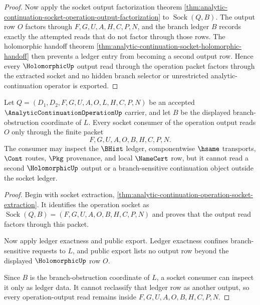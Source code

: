 \begin{proof}
Now apply the socket output factorization theorem \autoref{thm:analytic-continuation-socket-operation-output-factorization} to $\operatorname{Sock}(Q,B)$. The output row $O$ factors through $F,G,U,A,H,C,P,N$, and the branch ledger $B$ records exactly the attempted reads that do not factor through those rows. The holomorphic handoff theorem \autoref{thm:analytic-continuation-socket-holomorphic-handoff} then prevents a ledger entry from becoming a second output row. Hence every $\HolomorphicUp$ output read through the operation packet factors through the extracted socket and no hidden branch selector or unrestricted analytic-continuation operator is exported.
\end{proof}

\begin{theorem}
\label{thm:analytic-continuation-operation-socket-ledger-consumer}
Let $Q=(D_1,D_2,F,G,U,A,O,L,H,C,P,N)$ be an accepted $\AnalyticContinuationOperationUp$ carrier, and let $B$ be the displayed branch-obstruction coordinate of $L$. Every socket consumer of the operation output reads $O$ only through the finite packet
$$
F,G,U,A,O,B,H,C,P,N.
$$
The consumer may inspect the $\BHist$ ledger, componentwise $\hsame$ transports, $\Cont$ routes, $\Pkg$ provenance, and local $\NameCert$ row, but it cannot read a second $\HolomorphicUp$ output or a branch-sensitive continuation object outside the socket ledger.
\end{theorem}
\begin{proof}
Begin with socket extraction, \autoref{thm:analytic-continuation-operation-socket-extraction}. It identifies the operation socket as $\operatorname{Sock}(Q,B)=(F,G,U,A,O,B,H,C,P,N)$ and proves that the output read factors through this packet.

Now apply ledger exactness and public export. Ledger exactness confines branch-sensitive requests to $L$, and public export lists no output row beyond the displayed $\HolomorphicUp$ row $O$.

Since $B$ is the branch-obstruction coordinate of $L$, a socket consumer can inspect it only as ledger data. It cannot reclassify that ledger row as another output, so every operation-output read remains inside $F,G,U,A,O,B,H,C,P,N$.
\end{proof}

